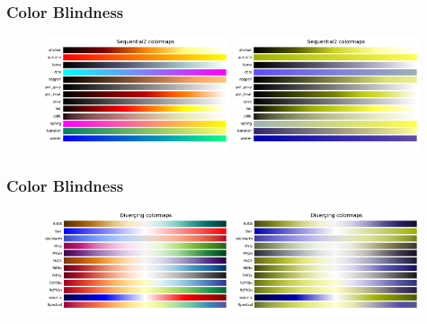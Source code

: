 \documentclass[ignorenonframetext]{beamer}
\begin{document}
\begin{frame}[t]\frametitle{Color Blindness}
    \begin{figure}[htbp]
        \centering
        \includegraphics[width=0.49\textwidth]{figures/Sequential2}
        \includegraphics[width=0.49\textwidth]{figures/Sequential2Deuteranopia}
    \end{figure}
\end{frame}
\begin{frame}[t]\frametitle{Color Blindness}
    \begin{figure}[htbp]
        \includegraphics[width=0.49\textwidth]{figures/Diverging}
        \includegraphics[width=0.49\textwidth]{figures/DivergingDeuteranopia}
    \end{figure}
\end{frame}
\end{document}
